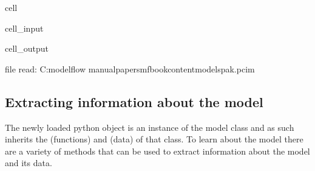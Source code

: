 \documentclass[letterpaper,10pt,english]{jupyterBook}
\begin{document}
\begin{sphinxuseclass}{cell}\begin{sphinxVerbatimInput}

\begin{sphinxuseclass}{cell_input}
\begin{sphinxVerbatim}[commandchars=\\\{\}]
   \PYGZbs{}
                                 
\end{sphinxVerbatim}

\end{sphinxuseclass}\end{sphinxVerbatimInput}
\begin{sphinxVerbatimOutput}

\begin{sphinxuseclass}{cell_output}
\begin{sphinxVerbatim}[commandchars=\\\{\}]
file read:  C:\PYGZbs{}modelflow manual\PYGZbs{}papers\PYGZbs{}mfbook\PYGZbs{}content\PYGZbs{}models\PYGZbs{}pak.pcim
\end{sphinxVerbatim}

\end{sphinxuseclass}\end{sphinxVerbatimOutput}

\end{sphinxuseclass}

\subsection{Extracting information about the model}
\label{\detokenize{content/05_WBModels/LoadingWBModel:extracting-information-about-the-model}}
\sphinxAtStartPar
The newly loaded python object   is an instance of the model class and as such inherits the  (functions) and  (data) of that class. To learn about the model there are a variety of methods that can be used to extract information about the model and its data.
\end{document}
